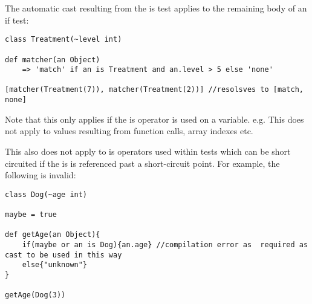 \documentclass[conc-doc]{subfiles}
\begin{document}
The automatic cast resulting from the is test applies to the remaining body of an if test:
\begin{lstlisting}
class Treatment(~level int)

def matcher(an Object) 
	=> 'match' if an is Treatment and an.level > 5 else 'none'

[matcher(Treatment(7)), matcher(Treatment(2))] //resolsves to [match, none]
\end{lstlisting}

Note that this only applies if the is operator is used on a variable. e.g. This does not apply to values resulting from function calls, array indexes etc.

This also does not apply to is operators used within tests which can be short circuited if the is is referenced past a short-circuit point. For example, the following is invalid:

\begin{lstlisting}
class Dog(~age int)

maybe = true

def getAge(an Object){
	if(maybe or an is Dog){an.age} //compilation error as  required as cast to be used in this way
	else{"unknown"}
}

getAge(Dog(3))
\end{lstlisting}
\end{document}
